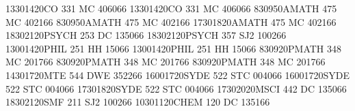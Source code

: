 \documentclass[preview]{standalone}
\begin{document}
\begin{center}
\begin{landscape}
\begin{timetable}
 {1330}{1420}{CO 331 {\tiny }}{\tiny }{MC 4060}{66}
 {1330}{1420}{CO 331 {\tiny }}{\tiny }{MC 4060}{66}
 {830}{950}{AMATH 475 {\tiny }}{\tiny }{MC 4021}{66}
 {830}{950}{AMATH 475 {\tiny }}{\tiny }{MC 4021}{66}
 {1730}{1820}{AMATH 475 {\tiny }}{\tiny }{MC 4021}{66}
 {1830}{2120}{PSYCH 253 {\tiny }}{\tiny }{DC 1350}{66}
 {1830}{2120}{PSYCH 357 {\tiny }}{\tiny }{SJ2 1002}{66}
 {1300}{1420}{PHIL 251 {\tiny }}{\tiny }{HH 150}{66}
 {1300}{1420}{PHIL 251 {\tiny }}{\tiny }{HH 150}{66}
 {830}{920}{PMATH 348 {\tiny }}{\tiny }{MC 2017}{66}
 {830}{920}{PMATH 348 {\tiny }}{\tiny }{MC 2017}{66}
 {830}{920}{PMATH 348 {\tiny }}{\tiny }{MC 2017}{66}
 {1430}{1720}{MTE 544 {\tiny }}{\tiny }{DWE 3522}{66}
 {1600}{1720}{SYDE 522 {\tiny }}{\tiny }{STC 0040}{66}
 {1600}{1720}{SYDE 522 {\tiny }}{\tiny }{STC 0040}{66}
 {1730}{1820}{SYDE 522 {\tiny }}{\tiny }{STC 0040}{66}
 {1730}{2020}{MSCI 442 {\tiny }}{\tiny }{DC 1350}{66}
 {1830}{2120}{SMF 211 {\tiny }}{\tiny }{SJ2 1002}{66}
 {1030}{1120}{CHEM 120 {\tiny }}{\tiny }{DC 1351}{66}

\end{timetable}
\end{landscape}
\end{center}
\end{document}
